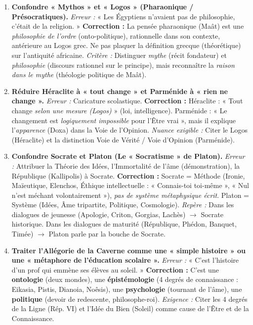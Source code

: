 \documentclass[11pt]{article}
\newcommand{\cle}[1]{{\popxbold\color{popdark}#1}}
\begin{document}
\begin{attention}
\begin{enumerate}
    \item \textbf{Confondre « Mythos » et « Logos » (Pharaonique / Présocratiques).} \emph{Erreur :} « Les Égyptiens n'avaient pas de philosophie, c'était de la religion. » \textbf{Correction :} La pensée pharaonique (Maât) est une \emph{philosophie de l'ordre} (onto-politique), rationnelle dans son contexte, antérieure au Logos grec. Ne pas plaquer la définition grecque (théorétique) sur l'antiquité africaine. \emph{Critère :} Distinguer \emph{mythe} (récit fondateur) et \emph{philosophie} (discours rationnel sur le principe), mais reconnaître la \emph{raison dans le mythe} (théologie politique de Maât).
    \item \textbf{Réduire Héraclite à « tout change » et Parménide à « rien ne change ».} \emph{Erreur :} Caricature scolastique. \textbf{Correction :} Héraclite : « Tout change \emph{selon une mesure (Logos)} » (loi, intelligence). Parménide : « Le changement est \emph{logiquement impossible} pour l'Être vrai », mais il explique l'\emph{apparence} (Doxa) dans la Voie de l'Opinion. \emph{Nuance exigible :} Citer le \cle{Logos} (Héraclite) et la distinction \cle{Voie de Vérité / Voie d'Opinion} (Parménide).
    \item \textbf{Confondre Socrate et Platon (Le « Socratisme » de Platon).} \emph{Erreur :} Attribuer la Théorie des Idées, l'Immortalité de l'âme (démonstration), la République (Kallipolis) à Socrate. \textbf{Correction :} Socrate = \cle{Méthode} (Ironie, Maïeutique, Elenchos, Éthique intellectuelle : « Connais-toi toi-même », « Nul n'est méchant volontairement »), \emph{pas de système métaphysique écrit}. Platon = \cle{Système} (Idées, Âme tripartite, Politique, Cosmologie). \emph{Repère :} Dans les dialogues de jeunesse (Apologie, Criton, Gorgias, Lachès) $\rightarrow$ Socrate historique. Dans les dialogues de maturité (République, Phédon, Banquet, Timée) $\rightarrow$ Platon parle par la bouche de Socrate.
    \item \textbf{Traiter l'Allégorie de la Caverne comme une « simple histoire » ou une « métaphore de l'éducation scolaire ».} \emph{Erreur :} « C'est l'histoire d'un prof qui emmène ses élèves au soleil. » \textbf{Correction :} C'est une \textbf{ontologie} (deux mondes), une \textbf{épistémologie} (4 degrés de connaissance : Eikasia, Pistis, Dianoia, Noêsis), une \textbf{psychologie} (tournant de l'âme), une \textbf{politique} (devoir de redescente, philosophe-roi). \emph{Exigence :} Citer les 4 degrés de la Ligne (Rép. VI) et l'Idée du Bien (Soleil) comme cause de l'Être et de la Connaissance.

\end{enumerate}
\end{attention}
\end{document}
